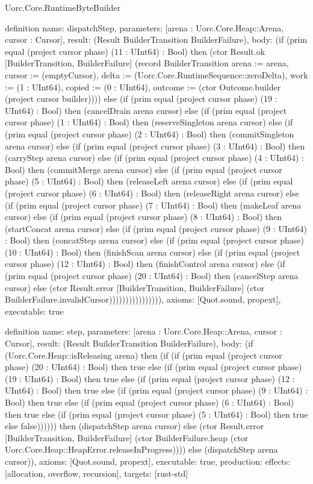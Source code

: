 \begin{lexlean}{Uorc.Core.RuntimeByteBuilder}
\begin{semanticmodule}
definition{
  name: dispatchStep,
  parameters: [arena : Uorc.Core.Heap::Arena, cursor : Cursor],
  result: (Result BuilderTransition BuilderFailure),
  body: (if (prim equal (project cursor phase) (11 : UInt64) : Bool) then (ctor Result.ok [BuilderTransition, BuilderFailure] (record BuilderTransition {arena := arena, cursor := (emptyCursor), delta := (Uorc.Core.RuntimeSequence::zeroDelta), work := (1 : UInt64), copied := (0 : UInt64), outcome := (ctor Outcome.builder (project cursor builder))})) else (if (prim equal (project cursor phase) (19 : UInt64) : Bool) then (cancelDrain arena cursor) else (if (prim equal (project cursor phase) (1 : UInt64) : Bool) then (reserveSingleton arena cursor) else (if (prim equal (project cursor phase) (2 : UInt64) : Bool) then (commitSingleton arena cursor) else (if (prim equal (project cursor phase) (3 : UInt64) : Bool) then (carryStep arena cursor) else (if (prim equal (project cursor phase) (4 : UInt64) : Bool) then (commitMerge arena cursor) else (if (prim equal (project cursor phase) (5 : UInt64) : Bool) then (releaseLeft arena cursor) else (if (prim equal (project cursor phase) (6 : UInt64) : Bool) then (releaseRight arena cursor) else (if (prim equal (project cursor phase) (7 : UInt64) : Bool) then (makeLeaf arena cursor) else (if (prim equal (project cursor phase) (8 : UInt64) : Bool) then (startConcat arena cursor) else (if (prim equal (project cursor phase) (9 : UInt64) : Bool) then (concatStep arena cursor) else (if (prim equal (project cursor phase) (10 : UInt64) : Bool) then (finishScan arena cursor) else (if (prim equal (project cursor phase) (12 : UInt64) : Bool) then (finishControl arena cursor) else (if (prim equal (project cursor phase) (20 : UInt64) : Bool) then (cancelStep arena cursor) else (ctor Result.error [BuilderTransition, BuilderFailure] (ctor BuilderFailure.invalidCursor)))))))))))))))),
  axioms: [Quot.sound, propext],
  executable: true
}

definition{
  name: step,
  parameters: [arena : Uorc.Core.Heap::Arena, cursor : Cursor],
  result: (Result BuilderTransition BuilderFailure),
  body: (if (Uorc.Core.Heap::isReleasing arena) then (if (if (prim equal (project cursor phase) (20 : UInt64) : Bool) then true else (if (prim equal (project cursor phase) (19 : UInt64) : Bool) then true else (if (prim equal (project cursor phase) (12 : UInt64) : Bool) then true else (if (prim equal (project cursor phase) (9 : UInt64) : Bool) then true else (if (prim equal (project cursor phase) (6 : UInt64) : Bool) then true else (if (prim equal (project cursor phase) (5 : UInt64) : Bool) then true else false)))))) then (dispatchStep arena cursor) else (ctor Result.error [BuilderTransition, BuilderFailure] (ctor BuilderFailure.heap (ctor Uorc.Core.Heap::HeapError.releaseInProgress)))) else (dispatchStep arena cursor)),
  axioms: [Quot.sound, propext],
  executable: true,
  production: {effects: [allocation, overflow, recursion], targets: [rust-std]}
}


\end{semanticmodule}
\end{lexlean}
